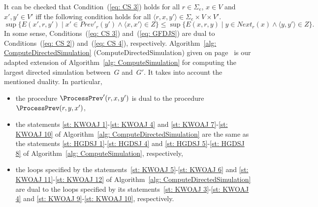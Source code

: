\documentclass[11pt]{article}
\def\tuple#1{\langle#1\rangle}
\def\eqref#1{(\ref{#1})}
\newcommand{\SE}{\Sigma_e}
\newcommand{\Next}{\mathit{Next}}
\newcommand{\PrevP}{\mathit{Prev}'}
\newcommand{\ComputeDirectedSimulation}{ComputeDirectedSimulation}
\begin{document}
It can be checked that Condition~\eqref{eq: CS 3} holds for all $r \in \SE$, $x \in V$ and $x',y' \in V'$ iff the following condition holds for all $\tuple{r,x,y'} \in \SE \times V \times V'$. 
\begin{equation}\label{eq: GFDJS}
\sup \{E(x',r,y') \mid x' \in \PrevP_r(y') \land \tuple{x,x'} \in Z\} \leq 
\sup \{E(x,r,y) \mid y \in \Next_r(x) \land \tuple{y,y'} \in Z\}.
\end{equation}
In some sense, Conditions~\eqref{eq: CS 3} and~\eqref{eq: GFDJS} are dual to Conditions~\eqref{eq: CS 2} and~\eqref{eq: CS 4}, respectively. Algorithm~\ref{alg: ComputeDirectedSimulation} (\ComputeDirectedSimulation) given on page~\pageref{alg: ComputeDirectedSimulation} is our adapted extension of Algorithm~\ref{alg: ComputeSimulation} for computing the largest directed simulation between~$G$ and~$G'$. It takes into account the mentioned duality. In particular, 
\begin{itemize}
\item the procedure $\ProcessPrev'(r,x,y')$ is dual to the procedure $\ProcessPrev(r,y,x')$, 
\item the statements \ref{st: KWOAJ 1}-\ref{st: KWOAJ 4} and \ref{st: KWOAJ 7}-\ref{st: KWOAJ 10} of Algorithm~\ref{alg: ComputeDirectedSimulation} are the same as the statements \ref{st: HGDSJ 1}-\ref{st: HGDSJ 4} and \ref{st: HGDSJ 5}-\ref{st: HGDSJ 8} of Algorithm~\ref{alg: ComputeSimulation}, respectively, 
\item the loops specified by the statements~\ref{st: KWOAJ 5}-\ref{st: KWOAJ 6} and \ref{st: KWOAJ 11}-\ref{st: KWOAJ 12} of Algorithm~\ref{alg: ComputeDirectedSimulation} are dual to the loops specified by its statements~\ref{st: KWOAJ 3}-\ref{st: KWOAJ 4} and \ref{st: KWOAJ 9}-\ref{st: KWOAJ 10}, respectively. 
\end{itemize}
\end{document}
